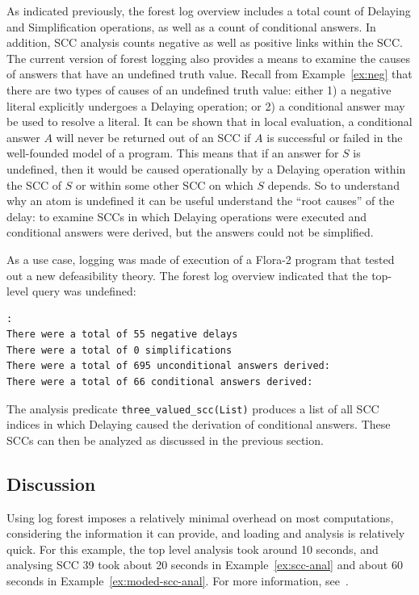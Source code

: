 As indicated previously, the forest log overview includes a total
count of {\sc Delaying} and {\sc Simplification} operations, as well
as a count of conditional answers.  In addition, SCC analysis counts
negative as well as positive links within the SCC.  The current
version of forest logging also provides a means to examine the causes
of answers that have an undefined truth value.  Recall from
Example~\ref{ex:neg} that there are two types of causes of an
undefined truth value: either 1) a negative literal explicitly
undergoes a {\sc Delaying} operation; or 2) a conditional answer may
be used to resolve a literal.  It can be shown that in local
evaluation, a conditional answer $A$ will never be returned out of an
SCC if $A$ is successful or failed in the well-founded model of a
program.  This means that if an answer for $S$ is undefined, then it
would be caused operationally by a {\sc Delaying} operation within the
SCC of $S$ or within some other SCC on which $S$ depends.  So to
understand why an atom is undefined it can be useful understand the
``root causes'' of the delay: to examine SCCs in which {\sc Delaying}
operations were executed and conditional answers were derived, but the
answers could not be simplified.

\begin{example}
As a use case, logging was made of execution of a Flora-2 program that
tested out a new defeasibility theory.  The forest log overview
indicated that the top-level query was undefined: 
%
\begin{small}
\begin{verbatim}
:
There were a total of 55 negative delays
There were a total of 0 simplifications
There were a total of 695 unconditional answers derived:
There were a total of 66 conditional answers derived:
\end{verbatim}
\end{small}
%
The analysis predicate {\tt three\_valued\_scc(List)} produces a list
of all SCC indices in which {\sc Delaying} caused the derivation of
conditional answers.  These SCCs can then be analyzed as discussed in
the previous section.
\end{example}

\subsection{Discussion}
%
Using log forest imposes a relatively minimal overhead on most
computations, considering the information it can provide, and loading
and analysis is relatively quick.  For this example, the top level
analysis took around 10 seconds, and analysing SCC 39 took about 20
seconds in Example~\ref{ex:scc-anal} and about 60 seconds in
Example~\ref{ex:moded-scc-anal}.  For more information,
see~\cite{Swif12a}.

